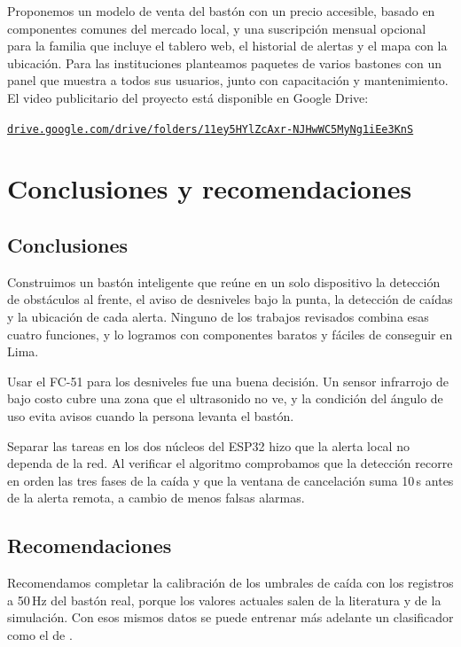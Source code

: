 \documentclass[conference,a4paper]{IEEEtran}
\begin{document}
Proponemos un modelo de venta del bastón con un precio accesible, basado en componentes comunes del mercado local, y una suscripción mensual opcional para la familia que incluye el tablero web, el historial de alertas y el mapa con la ubicación. Para las instituciones planteamos paquetes de varios bastones con un panel que muestra a todos sus usuarios, junto con capacitación y mantenimiento. El video publicitario del proyecto está disponible en Google Drive:
\begin{center}
\scriptsize\href{https://drive.google.com/drive/folders/11ey5HYlZcAxr-NJHwWC5MyNg1iEe3KnS}{\texttt{drive.google.com/drive/folders/11ey5HYlZcAxr-NJHwWC5MyNg1iEe3KnS}}
\end{center}

\section{Conclusiones y recomendaciones}

\subsection{Conclusiones}

Construimos un bastón inteligente que reúne en un solo dispositivo la detección de obstáculos al frente, el aviso de desniveles bajo la punta, la detección de caídas y la ubicación de cada alerta. Ninguno de los trabajos revisados combina esas cuatro funciones, y lo logramos con componentes baratos y fáciles de conseguir en Lima.

Usar el FC-51 para los desniveles fue una buena decisión. Un sensor infrarrojo de bajo costo cubre una zona que el ultrasonido no ve, y la condición del ángulo de uso evita avisos cuando la persona levanta el bastón.

Separar las tareas en los dos núcleos del ESP32 hizo que la alerta local no dependa de la red. Al verificar el algoritmo comprobamos que la detección recorre en orden las tres fases de la caída y que la ventana de cancelación suma 10\,s antes de la alerta remota, a cambio de menos falsas alarmas.

\subsection{Recomendaciones}

Recomendamos completar la calibración de los umbrales de caída con los registros a 50\,Hz del bastón real, porque los valores actuales salen de la literatura y de la simulación. Con esos mismos datos se puede entrenar más adelante un clasificador como el de \cite{shriharini}.
\end{document}
